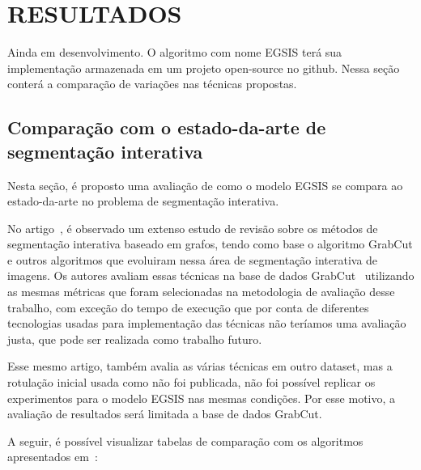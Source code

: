\chapter{RESULTADOS}\label{chap:resultados}

Ainda em desenvolvimento. O algoritmo com nome EGSIS terá sua
implementação armazenada em um projeto open-source no github. Nessa
seção conterá a comparação de variações nas técnicas propostas.


\section{Comparação com o estado-da-arte de segmentação interativa}\label{sec:comparacao-estado-da-arte}

Nesta seção, é proposto uma avaliação de como o modelo \gls{EGSIS} se
compara ao estado-da-arte no problema de segmentação interativa.

No artigo~\cite{wang2023review}, é observado
um extenso estudo de revisão sobre os métodos de segmentação
interativa baseado em grafos, tendo como base o algoritmo GrabCut e
outros algoritmos que evoluiram nessa área de segmentação interativa
de imagens. Os autores avaliam essas técnicas na base de
dados GrabCut~\cite{rother2004grabcut} utilizando as mesmas métricas que foram
selecionadas na metodologia de avaliação desse trabalho, com exceção
do tempo de execução que por conta de diferentes tecnologias usadas
para implementação das técnicas não teríamos uma avaliação justa, que
pode ser realizada como trabalho futuro.

Esse mesmo artigo, também avalia as várias técnicas em outro dataset,
mas a rotulação inicial usada como não foi publicada, não foi possível
replicar os experimentos para o modelo \gls{EGSIS} nas mesmas
condições. Por esse motivo, a avaliação de resultados será limitada a
base de dados GrabCut.

A seguir, é possível visualizar tabelas de comparação com os
algoritmos apresentados em~\cite{wang2023review}:


